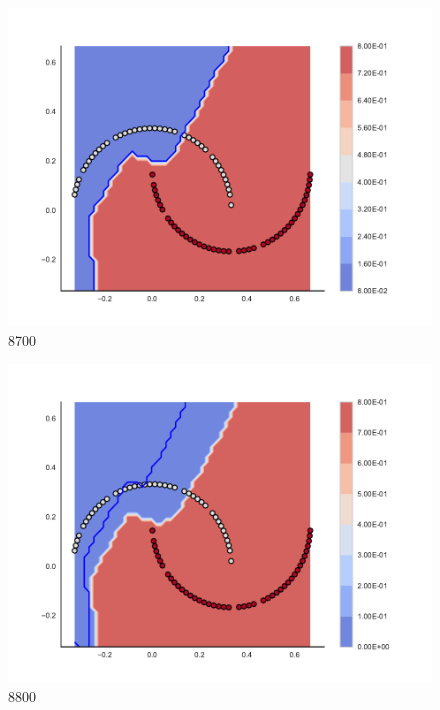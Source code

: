 \begin{subfigure}[b]{0.09\textwidth}
    \includegraphics[clip, trim=2.35cm 1.75cm 4.5cm 0cm,width=\textwidth]{img/convergence/8700.pdf}
    \caption{8700}
    \label{fig:convergence_8700}
\end{subfigure}
%
\begin{subfigure}[b]{0.09\textwidth}
    \includegraphics[clip, trim=2.35cm 1.75cm 4.5cm 0cm,width=\textwidth]{img/convergence/8800.pdf}
    \caption{8800}
    \label{fig:convergence_8800}
\end{subfigure}
%

